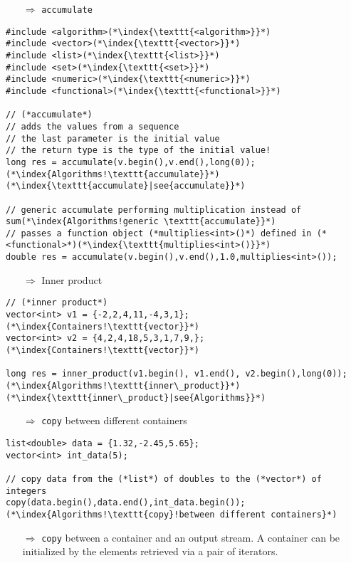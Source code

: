 \documentclass[10pt]{article}
\begin{document}
\begin{enumerate}
\item[$\Rightarrow$] \texttt{accumulate}
\end{enumerate}
\begin{lstlisting}
#include <algorithm>(*\index{\texttt{<algorithm>}}*)
#include <vector>(*\index{\texttt{<vector>}}*)
#include <list>(*\index{\texttt{<list>}}*)
#include <set>(*\index{\texttt{<set>}}*)
#include <numeric>(*\index{\texttt{<numeric>}}*)
#include <functional>(*\index{\texttt{<functional>}}*)

// (*accumulate*)
// adds the values from a sequence
// the last parameter is the initial value
// the return type is the type of the initial value!
long res = accumulate(v.begin(),v.end(),long(0));(*\index{Algorithms!\texttt{accumulate}}*)(*\index{\texttt{accumulate}|see{accumulate}}*)

// generic accumulate performing multiplication instead of sum(*\index{Algorithms!generic \texttt{accumulate}}*)
// passes a function object (*multiplies<int>()*) defined in (*<functional>*)(*\index{\texttt{multiplies<int>()}}*)
double res = accumulate(v.begin(),v.end(),1.0,multiplies<int>());
\end{lstlisting}
\begin{enumerate}
\item[$\Rightarrow$]  Inner product
\end{enumerate}
\begin{lstlisting}
// (*inner product*)
vector<int> v1 = {-2,2,4,11,-4,3,1};(*\index{Containers!\texttt{vector}}*)
vector<int> v2 = {4,2,4,18,5,3,1,7,9,};(*\index{Containers!\texttt{vector}}*)

long res = inner_product(v1.begin(), v1.end(), v2.begin(),long(0));(*\index{Algorithms!\texttt{inner\_product}}*)(*\index{\texttt{inner\_product}|see{Algorithms}}*)
\end{lstlisting}
\begin{enumerate}
\item[$\Rightarrow$]  \texttt{copy} between different containers
\end{enumerate}
\begin{lstlisting}
list<double> data = {1.32,-2.45,5.65};
vector<int> int_data(5);

// copy data from the (*list*) of doubles to the (*vector*) of integers
copy(data.begin(),data.end(),int_data.begin());(*\index{Algorithms!\texttt{copy}!between different containers}*)
\end{lstlisting}
\begin{enumerate}
\item[$\Rightarrow$]  \texttt{copy} between a container and an output stream. A container can be initialized by the elements retrieved via a pair of iterators.
\end{enumerate}
\end{document}
